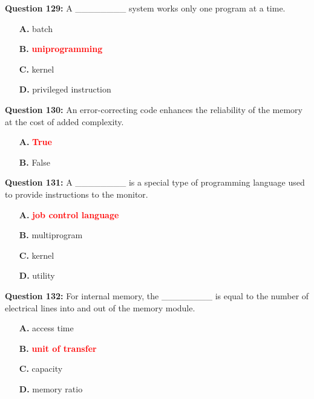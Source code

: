 \documentclass[12pt,a4paper]{article}
\begin{document}
\vspace{0.5cm}

\textbf{Question 129:} A ________ system works only one program at a time.

\begin{itemize}
    \item[\textbf{A.}] batch
    \item[\textbf{B.}] \textcolor{red}{\textbf{uniprogramming}}
    \item[\textbf{C.}] kernel
    \item[\textbf{D.}] privileged instruction
\end{itemize}

\vspace{0.5cm}

\textbf{Question 130:} An error-correcting code enhances the reliability of the memory at the cost of added complexity.

\begin{itemize}
    \item[\textbf{A.}] \textcolor{red}{\textbf{True}}
    \item[\textbf{B.}] False
\end{itemize}

\vspace{0.5cm}

\textbf{Question 131:} A ________ is a special type of programming language used to provide instructions to the monitor.

\begin{itemize}
    \item[\textbf{A.}] \textcolor{red}{\textbf{job control language}}
    \item[\textbf{B.}] multiprogram
    \item[\textbf{C.}] kernel
    \item[\textbf{D.}] utility
\end{itemize}

\vspace{0.5cm}

\textbf{Question 132:} For internal memory, the ________ is equal to the number of electrical lines into and out of the memory module.

\begin{itemize}
    \item[\textbf{A.}] access time
    \item[\textbf{B.}] \textcolor{red}{\textbf{unit of transfer}}
    \item[\textbf{C.}] capacity
    \item[\textbf{D.}] memory ratio
\end{itemize}
\end{document}
